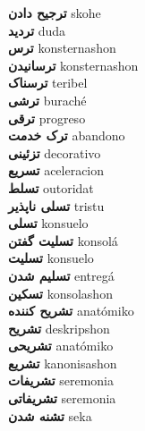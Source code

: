 \textbf{ ترجیح دادن  } skohe \\
\textbf{ تردید  } duda \\
\textbf{ ترس  } konsternashon \\
\textbf{ ترسانیدن  } konsternashon \\
\textbf{ ترسناک  } teribel \\
\textbf{ ترشی  } buraché \\
\textbf{ ترقی  } progreso \\
\textbf{ ترک خدمت  } abandono \\
\textbf{ تزئینی  } decorativo \\
\textbf{ تسریع  } aceleracion \\
\textbf{ تسلط  } outoridat \\
\textbf{ تسلی ناپذیر  } tristu \\
\textbf{ تسلی  } konsuelo \\
\textbf{ تسلیت گفتن  } konsolá \\
\textbf{ تسلیت  } konsuelo \\
\textbf{ تسلیم شدن  } entregá \\
\textbf{ تسکین  } konsolashon \\
\textbf{ تشریح کننده  } anatómiko \\
\textbf{ تشریح  } deskripshon \\
\textbf{ تشریحی  } anatómiko \\
\textbf{ تشریع  } kanonisashon \\
\textbf{ تشریفات  } seremonia \\
\textbf{ تشریفاتی  } seremonia \\
\textbf{ تشنه شدن  } seka \\
